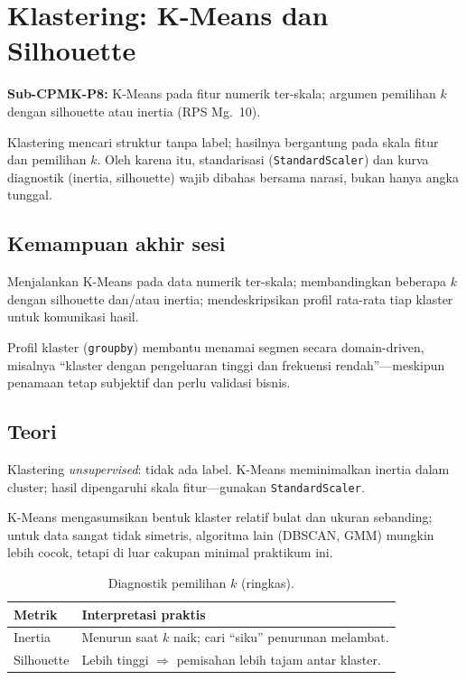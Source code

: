 \documentclass[../main.tex]{subfiles}
\begin{document}
\chapter{Klastering: K-Means dan Silhouette}

\begin{subcpmk}
  \item \textbf{Sub-CPMK-P8:} K-Means pada fitur numerik ter-skala; argumen pemilihan $k$ dengan silhouette atau inertia (RPS Mg.\ 10).
\end{subcpmk}


\noindent Klastering mencari struktur tanpa label; hasilnya bergantung pada skala fitur dan pemilihan $k$. Oleh karena itu, standarisasi (\texttt{StandardScaler}) dan kurva diagnostik (inertia, silhouette) wajib dibahas bersama narasi, bukan hanya angka tunggal.

\section{Kemampuan akhir sesi}

Menjalankan K-Means pada data numerik ter-skala; membandingkan beberapa $k$ dengan silhouette dan/atau inertia; mendeskripsikan profil rata-rata tiap klaster untuk komunikasi hasil.

Profil klaster (\texttt{groupby}) membantu menamai segmen secara domain-driven, misalnya ``klaster dengan pengeluaran tinggi dan frekuensi rendah''---meskipun penamaan tetap subjektif dan perlu validasi bisnis.

\section{Teori}

\begin{konsep}
Klastering \textit{unsupervised}: tidak ada label. K-Means meminimalkan inertia dalam cluster; hasil dipengaruhi skala fitur---gunakan \texttt{StandardScaler}.
\end{konsep}

K-Means mengasumsikan bentuk klaster relatif bulat dan ukuran sebanding; untuk data sangat tidak simetris, algoritma lain (DBSCAN, GMM) mungkin lebih cocok, tetapi di luar cakupan minimal praktikum ini.



\begin{table}[htbp]
\centering
\caption{Diagnostik pemilihan $k$ (ringkas).}
\label{tab:k-diagnostik}
\begin{tabular}{@{}p{3.2cm}p{9.5cm}@{}}
\toprule
\textbf{Metrik} & \textbf{Interpretasi praktis} \\
\midrule
Inertia & Menurun saat $k$ naik; cari ``siku'' penurunan melambat. \\
Silhouette & Lebih tinggi $\Rightarrow$ pemisahan lebih tajam antar klaster. \\
\bottomrule
\end{tabular}
\end{table}
\end{document}

